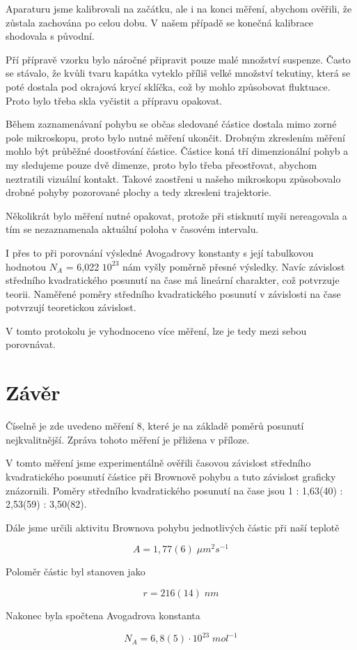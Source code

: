 Aparaturu jsme kalibrovali na začátku, ale i na konci měření, abychom ověřili, že zůstala zachována po celou dobu. V našem případě se konečná kalibrace shodovala s původní.

Pří přípravě vzorku bylo náročné připravit pouze malé množství suspenze. Často se stávalo, že kvůli tvaru kapátka vyteklo příliš velké množství tekutiny, která se poté dostala pod okrajová krycí sklíčka, což by mohlo způsobovat fluktuace. Proto bylo třeba skla vyčistit a přípravu opakovat.

Během zaznamenávaní pohybu se občas sledované částice dostala mimo zorné pole mikroskopu, proto bylo nutné měření ukončit. Drobným zkreslením měření mohlo být průběžné doostřování částice. Částice koná tří dimenzionální pohyb a my sledujeme pouze dvě dimenze, proto bylo třeba přeostřovat, abychom neztratili vizuální kontakt. Takové zaostřeni u našeho mikroskopu způsobovalo drobné pohyby pozorované plochy a tedy zkresleni trajektorie.

Několikrát bylo měření nutné opakovat, protože při stisknutí myši nereagovala a tím se nezaznamenala aktuální poloha v časovém intervalu.

I přes to při porovnání výsledné Avogadrovy konstanty s její tabulkovou hodnotou \(N_A\) = 6,022 \cdot $10^{23}$ nám vyšly poměrně přesné výsledky. Navíc závislost středního kvadratického posunutí na čase má lineární charakter, což potvrzuje teorii. Naměřené poměry středního kvadratického posunutí v závislosti na čase potvrzují teoretickou závislost.

V tomto protokolu je vyhodnoceno více měření, lze je tedy mezi sebou porovnávat.

\section{Závěr}
Číselně je zde uvedeno měření 8, které je na základě poměrů posunutí nejkvalitnější. Zpráva tohoto měření je přližena v příloze.

V tomto měření jsme experimentálně ověřili časovou závislost středního kvadratického posunutí částice při Brownově pohybu a tuto závislost graficky znázornili. Poměry středního kvadratického posunutí na čase jsou 1 : 1,63(40) : 2,53(59) : 3,50(82).

Dále jsme určili aktivitu Brownova pohybu jednotlivých částic při naší teplotě

\begin{equation}
    \nonumber
    A = 1,77(6) \; \mu m^2 s^{-1}
\end{equation}

Poloměr částic byl stanoven jako

\begin{equation}
    \nonumber
    r = 216(14) \; nm
\end{equation}

Nakonec byla spočtena Avogadrova konstanta

\begin{equation}
    \nonumber
    N_A = 6,8(5) \cdot 10^{23} \; mol^{-1}
\end{equation}
